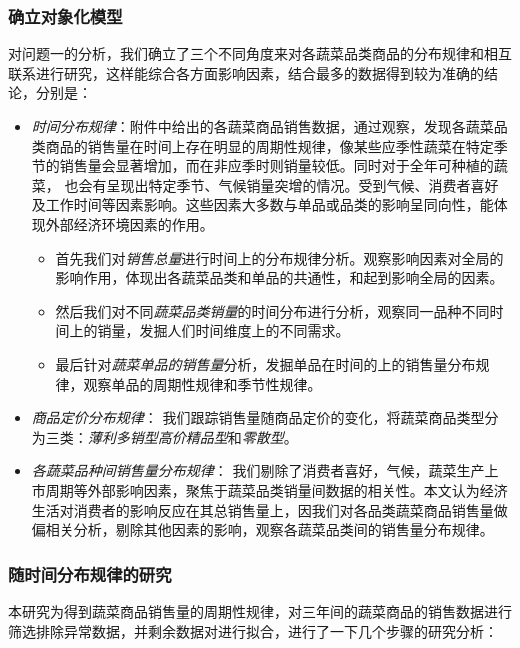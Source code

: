 \documentclass{article}
\begin{document}
\subsubsection{确立对象化模型}
对问题一的分析，我们确立了三个不同角度来对各蔬菜品类商品的分布规律和相互联系进行研究，这样能综合各方面影响因素，结合最多的数据得到较为准确的结论，分别是：
\begin{itemize}
    \item \textit{时间分布规律}：附件中给出的各蔬菜商品销售数据，通过观察，发现各蔬菜品类商品的销售量在时间上存在明显的周期性规律，像某些应季性蔬菜在特定季节的销售量会显著增加，而在非应季时则销量较低。同时对于全年可种植的蔬菜，
    也会有呈现出特定季节、气候销量突增的情况。受到气候、消费者喜好及工作时间等因素影响。这些因素大多数与单品或品类的影响呈同向性，能体现外部经济环境因素的作用。

    \begin{itemize}
        \item 首先我们对\textit{销售总量}进行时间上的分布规律分析。观察影响因素对全局的影响作用，体现出各蔬菜品类和单品的共通性，和起到影响全局的因素。
        \item 然后我们对不同\textit{蔬菜品类销量}的时间分布进行分析，观察同一品种不同时间上的销量，发掘人们时间维度上的不同需求。
        \item 最后针对\textit{蔬菜单品的销售量}分析，发掘单品在时间的上的销售量分布规律，观察单品的周期性规律和季节性规律。
    \end{itemize}
    \item \textit{商品定价分布规律}：
    我们跟踪销售量随商品定价的变化，将蔬菜商品类型分为三类：\textit{薄利多销型}\textit{高价精品型}和\textit{零散型}。
    \item \textit{各蔬菜品种间销售量分布规律}：
    我们剔除了消费者喜好，气候，蔬菜生产上市周期等外部影响因素，聚焦于蔬菜品类销量间数据的相关性。本文认为经济生活对消费者的影响反应在其总销售量上，因我们对各品类蔬菜商品销售量做偏相关分析，剔除其他因素的影响，观察各蔬菜品类间的销售量分布规律。
\end{itemize}

\subsubsection{随时间分布规律的研究}
本研究为得到蔬菜商品销售量的周期性规律，对三年间的蔬菜商品的销售数据进行筛选排除异常数据，并剩余数据对进行拟合，进行了一下几个步骤的研究分析：
\end{document}

